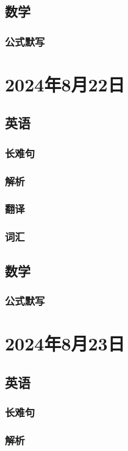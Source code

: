 \documentclass[UTF8]{ctexart}
\begin{document}
\subsection{数学}
\subsubsection{公式默写}
\begin{multicols}{2}
\end{multicols}
\section{2024年8月22日}
\subsection{英语}
\subsubsection{长难句}
\subsubsection{解析}
\subsubsection{翻译}
\subsubsection{词汇}
\subsection{数学}
\subsubsection{公式默写}
\begin{multicols}{2}
\end{multicols}
\section{2024年8月23日}
\subsection{英语}
\subsubsection{长难句}
\subsubsection{解析}
\end{document}
